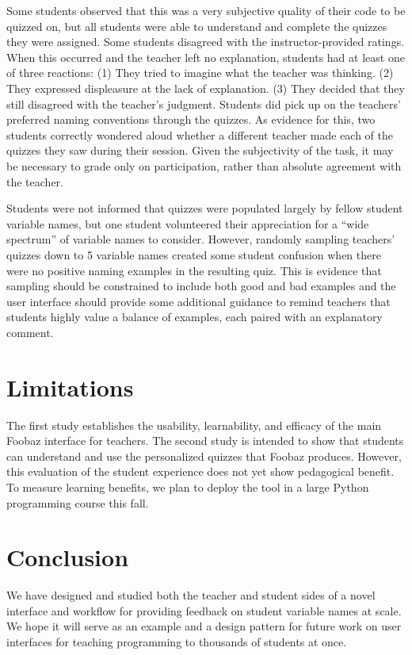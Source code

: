 Some students observed that this was a very subjective quality of their code to be quizzed on, but all students were able to understand and complete the quizzes they were assigned. Some students disagreed with the instructor-provided ratings. When this occurred and the teacher left no explanation, students had at least one of three reactions: (1) They tried to imagine what the teacher was thinking. (2) They expressed displeasure at the lack of explanation. (3) They decided that they still disagreed with the teacher's judgment. Students did pick up on the teachers' preferred naming conventions through the quizzes. As evidence for this, two students correctly wondered aloud whether a different teacher made each of the quizzes they saw during their session. Given the subjectivity of the task, it may be necessary to grade only on participation, rather than absolute agreement with the teacher.

Students were not informed that quizzes were populated largely by fellow student variable names, but one student volunteered their appreciation for a ``wide spectrum'' of variable names to consider. However, randomly sampling teachers' quizzes down to 5 variable names created some student confusion when there were no positive naming examples in the resulting quiz. This is evidence that sampling should be constrained to include both good and bad examples and the user interface should provide some additional guidance to remind teachers that students highly value a balance of examples, each paired with an explanatory comment.

\section{Limitations}

The first study establishes the usability, learnability, and efficacy of
the main Foobaz interface for teachers. The second study is intended to
show that students can understand and use the personalized quizzes that
Foobaz produces. However, this evaluation of the student experience does not yet show pedagogical benefit. To measure learning benefits, we plan to deploy the tool in a
large Python programming course this fall.


\section{Conclusion}

We have designed and studied both the teacher and student sides of a novel interface and workflow for providing feedback on student variable names at scale. We hope it will serve as an example and a design pattern for future work on user interfaces for teaching programming to thousands of students at once.